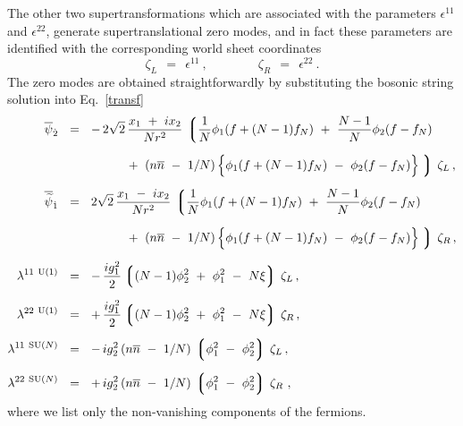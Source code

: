 \documentclass[12pt]{article}
\def\beq{\begin{equation}}
\def\eeq{\end{equation}}
\newcommand{\wt}{\widetilde}
\newcommand{\ov}{\overline}
\newcommand{\lgr}{\left\lgroup}
\newcommand{\rgr}{\right\rgroup}
\newcommand{\zr}{\zeta_R}
\newcommand{\zl}{\zeta_L}
\newcommand{\nbar}{\ov{n}}
\begin{document}
	The other two supertransformations which are associated with the parameters $ \epsilon^{11} $ and $ \epsilon^{22} $,
	generate supertranslational zero modes, and in fact these parameters are identified with the corresponding world sheet
	coordinates
\beq
\label{zeta}
	\zl ~~=~~ \epsilon^{11}~,  \qquad\qquad   \zr ~~=~~ \epsilon^{22}~.
\eeq
	The zero modes are obtained straightforwardly by substituting the bosonic string solution into Eq.~\eqref{transf}
\begin{align}
\label{N2_strans}
%
\notag
\ov{\psi}_{\dot{2}}	& ~~=~~  -\,  2\sqrt{2}\, \frac{x_1 ~+~ i x_2}{N r^2} \,
		\lgr \frac{1}{N} \phi_1 ( f + (N-1) f_N ) ~+~ \frac{N-1}{N} \phi_2 ( f - f_N )  \right.
		\\[2mm]
%
\notag
			& \phantom{~~=~~  -\,  2\sqrt{2}}
			~+~ \left( n\nbar ~-~ 1/N \right )
			\Bigl\{ \phi_1 ( f + ( N-1 ) f_N ) ~-~ \phi_2 ( f - f_N) \Bigr\}
		\left. \rgr\, \zeta_L \,,
		\\[2mm]
%
\notag
\ov{\wt{\psi}}_{\dot{1}} & ~~=~~    2\sqrt{2} \, \frac{x_1 ~-~ i x_2}{N r^2} \,
		\lgr \frac{1}{N} \phi_1 ( f + (N-1) f_N ) ~+~ \frac{N-1}{N} \phi_2 ( f - f_N ) \right.
		\\[2mm]
%
\notag
			& \phantom{~~=~~  -\,  2\sqrt{2}}
			~+~ \left( n\nbar ~-~ 1/N \right )
			\Bigl\{ \phi_1 ( f + ( N-1 ) f_N ) ~-~ \phi_2 ( f - f_N) \Bigr\}
		\left. \rgr\, \zeta_R\,,
		\\[2mm]
%
\lambda^{11\ \rm U(1)} 	& ~~=~~ -\, \frac{i g_1^2}{2} \lgr (N-1)\phi_2^2  ~+~ \phi_1^2 ~-~ N\xi \rgr \, \zeta_L \,,
		\\[2mm]
%
\notag
\lambda^{22\ \rm U(1)} 	& ~~=~~ +\, \frac{i g_1^2}{2} \lgr (N-1)\phi_2^2  ~+~ \phi_1^2 ~-~ N\xi \rgr \, \zeta_R \,,
		\\[2mm]
%
\notag
\lambda^{11\ \text{SU($N$)}}	& ~~=~~ -\, {i g_2^2}\, ( n\nbar ~-~ 1/N )\, \lgr \phi_1^2 ~-~ \phi_2^2 \rgr\, \zeta_L\,,
		\\[2mm]
%
\notag
\lambda^{22\ \text{SU($N$)}}	& ~~=~~ +\, {i g_2^2}\, ( n\nbar ~-~ 1/N )\, \lgr \phi_1^2 ~-~ \phi_2^2 \rgr\, \zeta_R
	~,
\end{align}
	where we list only the non-vanishing components of the fermions.
	
\end{document}

